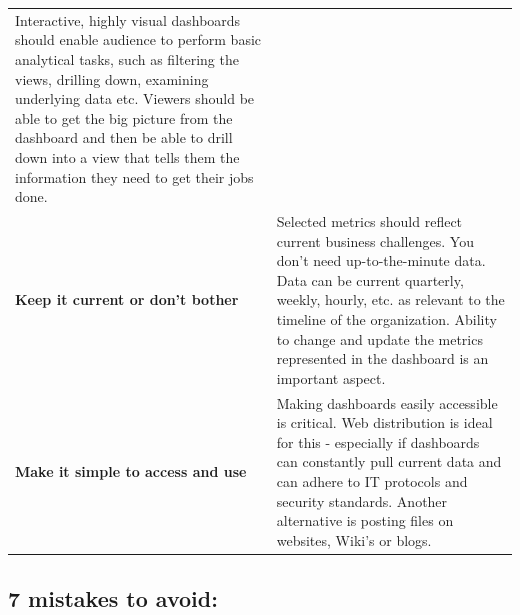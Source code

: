 \documentclass[]{book}
\theoremstyle{definition}
\theoremstyle{definition}
\theoremstyle{definition}
\theoremstyle{remark}
\begin{document}
\begin{longtable}[]{@{}ll@{}}
\begin{minipage}[t]{0.72\columnwidth}
Interactive, highly visual dashboards should enable audience to perform
basic analytical tasks, such as filtering the views, drilling down,
examining underlying data etc. Viewers should be able to get the big
picture from the dashboard and then be able to drill down into a view
that tells them the information they need to get their jobs done.\strut
\end{minipage}\tabularnewline
\begin{minipage}[t]{0.17\columnwidth}\raggedright\strut
\textbf{Keep it current or don't bother}\strut
\end{minipage} & \begin{minipage}[t]{0.72\columnwidth}\raggedright\strut
Selected metrics should reflect current business challenges. You don't
need up-to-the-minute data. Data can be current quarterly, weekly,
hourly, etc. as relevant to the timeline of the organization. Ability to
change and update the metrics represented in the dashboard is an
important aspect.\strut
\end{minipage}\tabularnewline
\begin{minipage}[t]{0.17\columnwidth}\raggedright\strut
\textbf{Make it simple to access and use}\strut
\end{minipage} & \begin{minipage}[t]{0.72\columnwidth}\raggedright\strut
Making dashboards easily accessible is critical. Web distribution is
ideal for this - especially if dashboards can constantly pull current
data and can adhere to IT protocols and security standards. Another
alternative is posting files on websites, Wiki's or blogs.\strut
\end{minipage}\tabularnewline
\bottomrule
\end{longtable}

\subsection{7 mistakes to avoid:}\label{mistakes-to-avoid}
\end{document}
